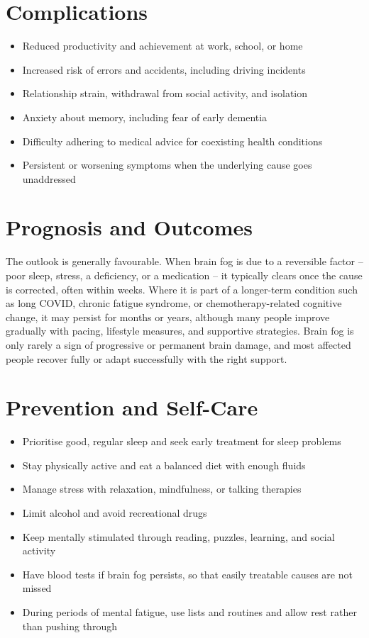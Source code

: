 \section*{Complications}
\begin{itemize}
    \item Reduced productivity and achievement at work, school, or home
    \item Increased risk of errors and accidents, including driving incidents
    \item Relationship strain, withdrawal from social activity, and isolation
    \item Anxiety about memory, including fear of early dementia
    \item Difficulty adhering to medical advice for coexisting health conditions
    \item Persistent or worsening symptoms when the underlying cause goes unaddressed
\end{itemize}

\section*{Prognosis and Outcomes}
The outlook is generally favourable. When brain fog is due to a reversible factor -- poor sleep, stress, a deficiency, or a medication -- it typically clears once the cause is corrected, often within weeks. Where it is part of a longer-term condition such as long COVID, chronic fatigue syndrome, or chemotherapy-related cognitive change, it may persist for months or years, although many people improve gradually with pacing, lifestyle measures, and supportive strategies. Brain fog is only rarely a sign of progressive or permanent brain damage, and most affected people recover fully or adapt successfully with the right support.

\section*{Prevention and Self-Care}
\begin{itemize}
    \item Prioritise good, regular sleep and seek early treatment for sleep problems
    \item Stay physically active and eat a balanced diet with enough fluids
    \item Manage stress with relaxation, mindfulness, or talking therapies
    \item Limit alcohol and avoid recreational drugs
    \item Keep mentally stimulated through reading, puzzles, learning, and social activity
    \item Have blood tests if brain fog persists, so that easily treatable causes are not missed
    \item During periods of mental fatigue, use lists and routines and allow rest rather than pushing through
\end{itemize}

